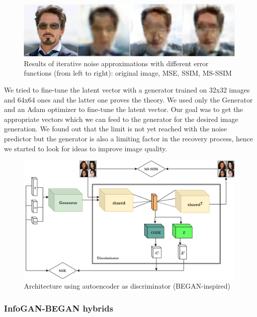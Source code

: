 \documentclass{egpubl}
\begin{document}
\begin{figure}[!htb]
	\centering
	\includegraphics[width=\linewidth]{pic/tony_iterative}
	\caption{Results of iterative noise approximations with different error functions (from left to right): original image, MSE, SSIM, MS-SSIM}
	\label{fig:tony_iterative}
\end{figure}

We tried to fine-tune the latent vector with a generator trained on 32x32 images and 64x64 ones and the latter one proves the theory. We used only the Generator and an Adam optimizer to fine-tune the latent vector. Our goal was to get the appropriate vectors which we can feed to the generator for the desired image generation. We found out that the limit is not yet reached with the noise predictor but the generator is also a limiting factor in the recovery process, hence we started to look for ideas to improve image quality.

\begin{figure}[!htb]
	\centering
	\includegraphics[width=\linewidth]{pic/3}
	\caption{Architecture using autoencoder as discriminator (BEGAN-inspired)}
	\label{fig:infogan_ae}
\end{figure}





\subsubsection{InfoGAN-BEGAN hybrids}
\end{document}
